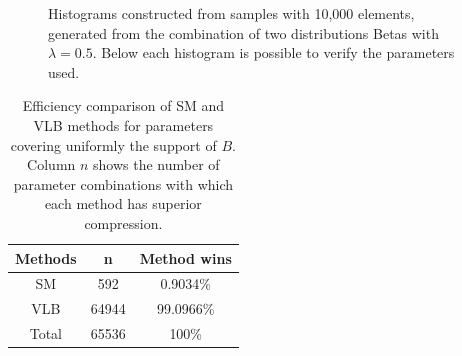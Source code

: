 \documentclass[10pt]{article}
\begin{document}
\begin{figure}[h]
{  }
  \caption{Histograms constructed from samples with 10,000 elements, generated from the combination of two distributions Betas  with $\lambda=0.5$. Below each histogram is possible to verify the parameters used.}
  \label{fig:13141516}
\end{figure}

\begin{table}[h]
 \centering
 \caption{Efficiency comparison of SM and VLB methods for parameters covering uniformly the support of $B$. Column $n$ shows the number of parameter combinations with which each method has superior compression.}
 \begin{tabular}{ccc}
  \hline 
  Methods  & n   & Method wins \\
  \hline
  SM	   & 592	& 0.9034\% \\
  VLB	   & 64944	& 99.0966\% \\
  \hline
  Total    & 65536	& 100\% \\
  \hline
 \end{tabular}
 \label{tab:02}
\end{table}
\end{document}
